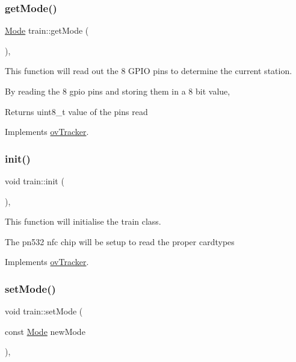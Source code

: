 \subsubsection{\texorpdfstring{get\+Mode()}{getMode()}}
{\footnotesize\ttfamily \hyperlink{stations_8h_ad03936209251465257e0fdcfb33dbf91}{Mode} train\+::get\+Mode (\begin{DoxyParamCaption}{ }\end{DoxyParamCaption})\hspace{0.3cm}{\ttfamily [override]}, {\ttfamily [virtual]}}



This function will read out the 8 G\+P\+IO pins to determine the current station. 

By reading the 8 gpio pins and storing them in a 8 bit value, \begin{DoxyReturn}{Returns}
uint8\+\_\+t value of the pins read 
\end{DoxyReturn}


Implements \hyperlink{classovTracker_afda6f161dc45106e43fc5031916fd91a}{ov\+Tracker}.

\mbox{\label{classtrain_a52db26884bf0f979ad55ce92f3d2f159}} 
\subsubsection{\texorpdfstring{init()}{init()}}
{\footnotesize\ttfamily void train\+::init (\begin{DoxyParamCaption}{ }\end{DoxyParamCaption})\hspace{0.3cm}{\ttfamily [override]}, {\ttfamily [virtual]}}



This function will initialise the train class. 

The pn532 nfc chip will be setup to read the proper cardtypes 

Implements \hyperlink{classovTracker_aa12f6c32a67e9a00d4b733963c54b443}{ov\+Tracker}.

\mbox{\label{classtrain_ae4cd3a06c0b736f2de38dd7987e9576e}} 
\subsubsection{\texorpdfstring{set\+Mode()}{setMode()}}
{\footnotesize\ttfamily void train\+::set\+Mode (\begin{DoxyParamCaption}\item[{const \hyperlink{stations_8h_ad03936209251465257e0fdcfb33dbf91}{Mode}}]{new\+Mode }\end{DoxyParamCaption})\hspace{0.3cm}{\ttfamily [override]}, {\ttfamily [virtual]}}




